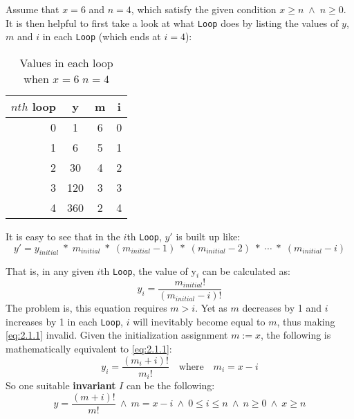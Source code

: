 Assume that $x = 6$ and $n = 4$, which satisfy the given condition $ x \geq n \;\land\; n \geq 0$.  It is then helpful to first take a look at what \texttt{Loop} does by listing the values of $y$, $m$ and $i$ in each \texttt{Loop} (which ends at $i = 4$):

\begin{table}[h]
  \centering
  \begin{tabular}{r||c|c|c}
    \hline
    $nth$ loop & y & m & i \\
    \hline
    0 & 1 & 6 & 0 \\
    1 & 6 & 5 & 1 \\
    2 & 30 & 4 & 2 \\
    3 & 120 & 3 & 3 \\
    4 & 360 & 2 & 4 \\
    \hline
  \end{tabular}
  \caption{Values in each loop when \(x=6\;n=4\)}
  \label{tab:loop}
\end{table}

It is easy to see that in the $i$th \texttt{Loop}, $y'$ is built up like:
\[
  y' =
  y_{initial} \;*\; m_{initial}\;*\;(m_{initial} - 1)\;*\;(m_{initial}-  2)\;*\;\dotsb\;*\; (m_{initial} - i)
\]

That is, in any given $i$th \texttt{Loop},  the value of y$_{i}$ can be calculated as:
\begin{equation}
\label{eq:2.1.1}
y_{i} = \frac{m_{initial}!}{(m_{initial} - i)!}
\end{equation}
The problem is, this equation requires $m > i$.  Yet as $m$ decreases by 1 and $i$ increases by 1 in each \texttt{Loop}, $i$ will inevitably become equal to $m$, thus making \eqref{eq:2.1.1} invalid.  Given the initialization assignment \(m:=x\), the following is mathematically equivalent to \eqref{eq:2.1.1}:
\[
  y_{i} = \frac{(m_{i}+i)!}{m_{i}!} \quad \text{where}\quad m_{i}= x - i
\]
So one suitable \textbf{invariant} \(I\) can be the following:
\begin{equation}
\label{eq:2.1.2}
  y = \frac{(m+i)!}{m!}\:\land\:m=x-i\:\land\:0 \leq i \leq n\:\land\:n \geq 0\:\land\:x \geq n
\end{equation}
